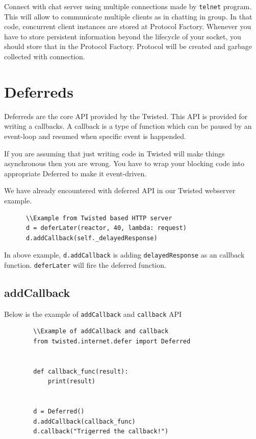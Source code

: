 \documentclass{article}
\begin{document}
    Connect with chat server using multiple connections made by \texttt{telnet}
    program. This will allow to communicate multiple clients as in chatting in
    group. In that code, concurrent client instances are stored at Protocol
    Factory. Whenever you have to store persistent information beyond the
    lifecycle of your socket, you should store that in the Protocol Factory.
    Protocol will be created and garbage collected with connection.

  \section{Deferreds}
    Deferreds are the core API provided by the Twisted. This API is provided
    for writing a callbacks. A callback is a type of function which can be
    paused by an event-loop and resumed when specific event is happended.

    If you are assuming that just writing code in Twisted will make things
    asynchronous then you are wrong. You have to wrap your blocking code into
    appropriate Deferred to make it event-driven.

    We have already encountered with deferred API in our Twisted webserver
    example.

    \begin{verbatim}
      \\Example from Twisted based HTTP server
      d = deferLater(reactor, 40, lambda: request)
      d.addCallback(self._delayedResponse)
    \end{verbatim}

    In above example, \texttt{d.addCallback} is adding \texttt{delayedResponse}
    as an callback function. \texttt{deferLater} will fire the deferred
    function.

    \subsection{addCallback}
      Below is the example of \texttt{addCallback} and \texttt{callback} API

      \begin{verbatim}
        \\Example of addCallback and callback
        from twisted.internet.defer import Deferred


        def callback_func(result):
            print(result)


        d = Deferred()
        d.addCallback(callback_func)
        d.callback("Trigerred the callback!")
      \end{verbatim}
\end{document}
